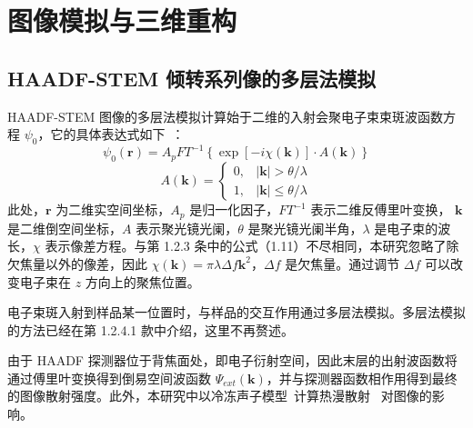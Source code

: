\section{图像模拟与三维重构}
\subsection{HAADF-STEM 倾转系列像的多层法模拟}
HAADF-STEM 图像的多层法模拟计算始于二维的入射会聚电子束束斑波函数方程 $\psi_0$，它的具体表达式如下~\cite{Kirkland2011,Aveyard2016,Tanaka1999}：
\begin{equation}
\psi_0(\boldsymbol{r}) = A_pFT^{-1}\left\{\exp\left[-i\chi(\boldsymbol{k})\right]\cdot A(\boldsymbol{k})\right\}
\end{equation}
\begin{equation}
A(\boldsymbol{k})=\left\{ \begin{array}{cc} 0, &|\boldsymbol{k}|>\theta /\lambda \\ 1, &|\boldsymbol{k}|\leq \theta /\lambda 
\end{array} \right.
\end{equation}
此处，$\boldsymbol{r}$ 为二维实空间坐标，$A_p$ 是归一化因子，$FT^{-1}$ 表示二维反傅里叶变换， $\boldsymbol{k}$ 是二维倒空间坐标，$A$ 表示聚光镜光阑，$\theta$ 是聚光镜光阑半角，$\lambda$ 是电子束的波长，$\chi$ 表示像差方程。与第 1.2.3 条中的公式（1.11）不尽相同，本研究忽略了除欠焦量以外的像差，因此 $\chi(\boldsymbol{k})= \pi\lambda\Delta f\boldsymbol{k}^2$，$\Delta f$ 是欠焦量。通过调节 $\Delta f$ 可以改变电子束在 $z$ 方向上的聚焦位置。

电子束斑入射到样品某一位置时，与样品的交互作用通过多层法模拟。多层法模拟的方法已经在第 1.2.4.1 款中介绍，这里不再赘述。

由于 HAADF 探测器位于背焦面处，即电子衍射空间，因此末层的出射波函数将通过傅里叶变换得到倒易空间波函数 $\Psi_{ext}(\boldsymbol{k})$，并与探测器函数相作用得到最终的图像散射强度。此外，本研究中以冷冻声子模型~\cite{Wang1998,Alania2018}计算热漫散射~\cite{Hillyard1995} 对图像的影响。

